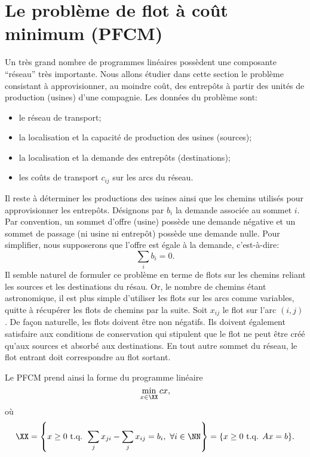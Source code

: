 \section{Le problème de flot à coût minimum (PFCM)}

Un très grand nombre de programmes linéaires possèdent une composante ``réseau'' très importante.
Nous allons étudier dans cette section le problème consistant à approvisionner, au moindre coût, des entrepôts à partir des unités de production (usines) d'une compagnie.
Les données du problème sont:
\begin{itemize}
\item
le réseau de transport;
\item
la localisation et la capacité de production des usines (sources);
\item
la localisation et la demande des entrepôts (destinations);
\item
les coûts de transport $c_{ij}$ sur les arcs du réseau.
\end{itemize}
Il reste à déterminer les productions des usines ainsi que les chemins utilisés pour approvisionner les entrepôts.
Désignons par $b_i$ la demande associée au sommet $i$.
Par convention, un sommet d'offre (usine) possède une demande négative et un sommet de passage (ni usine ni entrepôt) possède une demande nulle.
Pour simplifier, nous supposerons que l'offre est égale à la demande, c'est-à-dire:
\[
\sum_i b_i = 0.
\]
Il semble naturel de formuler ce problème en terme de flots sur les chemins reliant les sources et les destinations du résau.
Or, le nombre de chemins étant astronomique, il est plus simple d'utiliser les flots
sur les arcs comme variables, quitte à récupérer les flots de chemins par la suite.
Soit $x_{ij}$ le flot sur l'arc $(i, j)$.
De façon naturelle, les flots doivent être non négatifs.
Ils doivent également satisfaire aux conditions de conservation qui stipulent que le flot ne peut être créé qu'aux sources et absorbé aux destinations.
En tout autre sommet du réseau, le flot entrant doit correspondre au flot sortant.

Le PFCM prend ainsi la forme du programme linéaire
\[
\min_{x \in \XX} cx,
\]
où
\[
\XX = \left\lbrace
x \geq 0 \mbox{ t.q. } \sum_j x_{ji} - \sum_j x_{ij} = b_i,\ \forall i \in \NN \right\rbrace
= \lbrace x \geq 0 \mbox{ t.q. } Ax = b \rbrace.
\]

